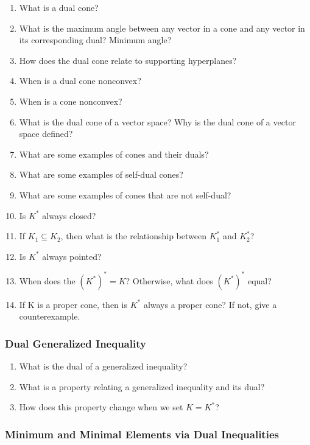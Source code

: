 \documentclass[]{article}
\newcounter{q}
\begin{document}
\begin{enumerate}[resume*]
\item What is a dual cone?
\item What is the maximum angle between any vector in a cone and any vector in its corresponding dual? Minimum angle?
\item How does the dual cone relate to supporting hyperplanes?
\item When is a dual cone nonconvex?
\item When is a cone nonconvex?
\item What is the dual cone of a vector space? Why is the dual cone of a vector space defined?
\item What are some examples of cones and their duals?
\item What are some examples of self-dual cones?
\item What are some examples of cones that are not self-dual?
\item Is $K^{*}$ always closed?
\item If $K_{1} \subseteq K_{2}$, then what is the relationship between $K_{1}^{*}$ and $K_{2}^{*}$?
\item Is $K^{*}$ always pointed?
\item When does the $(K^{*})^{*}=K$? Otherwise, what does $(K^{*})^{*}$ equal?
\item If K is a proper cone, then is $K^{*}$ always a proper cone? If not, give a counterexample.
\end{enumerate}

\subsubsection*{Dual Generalized Inequality}

\begin{enumerate}[resume*]
\item What is the dual of a generalized inequality?
\item What is a property relating a generalized inequality and its dual?
\item How does this property change when we set $K=K^{*}$?
\end{enumerate}

\subsubsection*{Minimum and Minimal Elements via Dual Inequalities}
\end{document}
